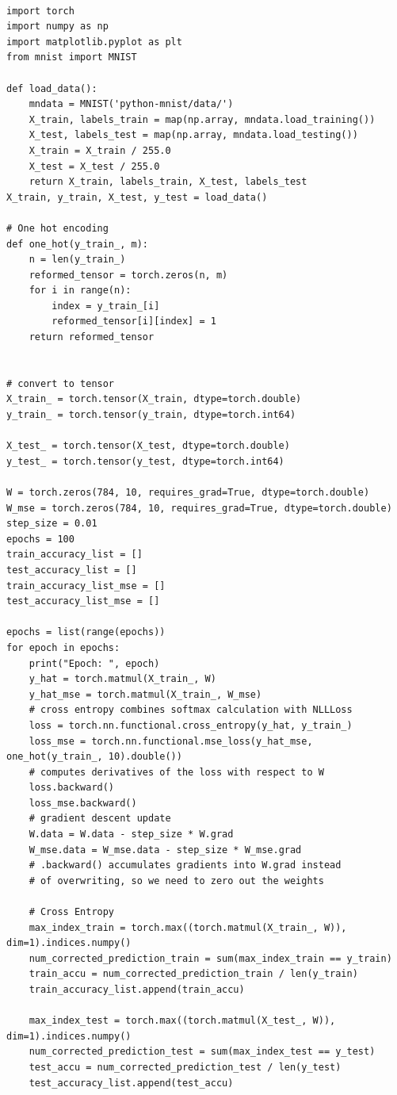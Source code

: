 \documentclass{article}
\begin{document}
\begin{verbatim}

import torch
import numpy as np
import matplotlib.pyplot as plt
from mnist import MNIST

def load_data():
	mndata = MNIST('python-mnist/data/')
	X_train, labels_train = map(np.array, mndata.load_training())
	X_test, labels_test = map(np.array, mndata.load_testing())
	X_train = X_train / 255.0
	X_test = X_test / 255.0
	return X_train, labels_train, X_test, labels_test
X_train, y_train, X_test, y_test = load_data()

# One hot encoding
def one_hot(y_train_, m):
	n = len(y_train_)
	reformed_tensor = torch.zeros(n, m)
	for i in range(n):
		index = y_train_[i]
		reformed_tensor[i][index] = 1
	return reformed_tensor


# convert to tensor
X_train_ = torch.tensor(X_train, dtype=torch.double)
y_train_ = torch.tensor(y_train, dtype=torch.int64)

X_test_ = torch.tensor(X_test, dtype=torch.double)
y_test_ = torch.tensor(y_test, dtype=torch.int64)

W = torch.zeros(784, 10, requires_grad=True, dtype=torch.double)
W_mse = torch.zeros(784, 10, requires_grad=True, dtype=torch.double)
step_size = 0.01
epochs = 100
train_accuracy_list = []
test_accuracy_list = []
train_accuracy_list_mse = []
test_accuracy_list_mse = []

epochs = list(range(epochs))
for epoch in epochs:
	print("Epoch: ", epoch)
	y_hat = torch.matmul(X_train_, W)
	y_hat_mse = torch.matmul(X_train_, W_mse)
	# cross entropy combines softmax calculation with NLLLoss
	loss = torch.nn.functional.cross_entropy(y_hat, y_train_)
	loss_mse = torch.nn.functional.mse_loss(y_hat_mse, one_hot(y_train_, 10).double())
	# computes derivatives of the loss with respect to W
	loss.backward()
	loss_mse.backward()
	# gradient descent update
	W.data = W.data - step_size * W.grad
	W_mse.data = W_mse.data - step_size * W_mse.grad
	# .backward() accumulates gradients into W.grad instead
	# of overwriting, so we need to zero out the weights
	
	# Cross Entropy
	max_index_train = torch.max((torch.matmul(X_train_, W)), dim=1).indices.numpy()
	num_corrected_prediction_train = sum(max_index_train == y_train)
	train_accu = num_corrected_prediction_train / len(y_train)
	train_accuracy_list.append(train_accu)
	
	max_index_test = torch.max((torch.matmul(X_test_, W)), dim=1).indices.numpy()
	num_corrected_prediction_test = sum(max_index_test == y_test)
	test_accu = num_corrected_prediction_test / len(y_test)
	test_accuracy_list.append(test_accu)
	

\end{verbatim}
\end{document}
